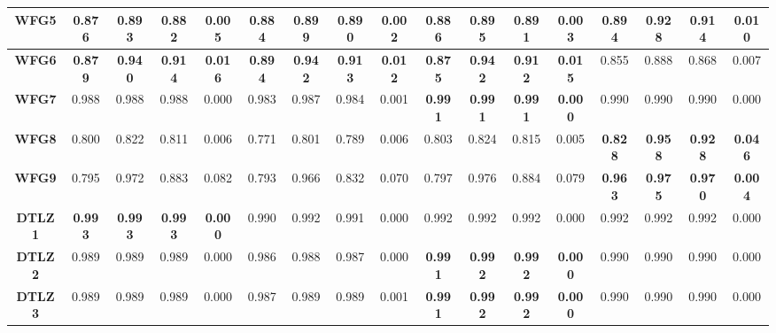 \begin{table*}[t]
{\begin{tabular}{cc|c|c|c|c|c|c|c|c|c|c|c|c|c|c|c}
\multicolumn{1}{c|}{\textbf{WFG5}}  & 0.876          & 0.893          & 0.882          & 0.005          & 0.884          & 0.899          & 0.890          & 0.002          & 0.886          & 0.895          & 0.891          & 0.003          & \textbf{0.894} & \textbf{0.928} & \textbf{0.914} & \textbf{0.010} \\ \hline
\multicolumn{1}{c|}{\textbf{WFG6}}  & \textbf{0.879} & \textbf{0.940} & \textbf{0.914} & \textbf{0.016} & \textbf{0.894} & \textbf{0.942} & \textbf{0.913} & \textbf{0.012} & \textbf{0.875} & \textbf{0.942} & \textbf{0.912} & \textbf{0.015} & 0.855          & 0.888          & 0.868          & 0.007          \\ \hline
\multicolumn{1}{c|}{\textbf{WFG7}}  & 0.988          & 0.988          & 0.988          & 0.000          & 0.983          & 0.987          & 0.984          & 0.001          & \textbf{0.991} & \textbf{0.991} & \textbf{0.991} & \textbf{0.000} & 0.990          & 0.990          & 0.990          & 0.000          \\ \hline
\multicolumn{1}{c|}{\textbf{WFG8}}  & 0.800          & 0.822          & 0.811          & 0.006          & 0.771          & 0.801          & 0.789          & 0.006          & 0.803          & 0.824          & 0.815          & 0.005          & \textbf{0.828} & \textbf{0.958} & \textbf{0.928} & \textbf{0.046} \\ \hline
\multicolumn{1}{c|}{\textbf{WFG9}}  & 0.795          & 0.972          & 0.883          & 0.082          & 0.793          & 0.966          & 0.832          & 0.070          & 0.797          & 0.976          & 0.884          & 0.079          & \textbf{0.963} & \textbf{0.975} & \textbf{0.970} & \textbf{0.004} \\ \hline
\multicolumn{1}{c|}{\textbf{DTLZ1}} & \textbf{0.993} & \textbf{0.993} & \textbf{0.993} & \textbf{0.000} & 0.990          & 0.992          & 0.991          & 0.000          & 0.992          & 0.992          & 0.992          & 0.000          & 0.992          & 0.992          & 0.992          & 0.000          \\ \hline
\multicolumn{1}{c|}{\textbf{DTLZ2}} & 0.989          & 0.989          & 0.989          & 0.000          & 0.986          & 0.988          & 0.987          & 0.000          & \textbf{0.991} & \textbf{0.992} & \textbf{0.992} & \textbf{0.000} & 0.990          & 0.990          & 0.990          & 0.000          \\ \hline
\multicolumn{1}{c|}{\textbf{DTLZ3}} & 0.989          & 0.989          & 0.989          & 0.000          & 0.987          & 0.989          & 0.989          & 0.001          & \textbf{0.991} & \textbf{0.992} & \textbf{0.992} & \textbf{0.000} & 0.990          & 0.990          & 0.990          & 0.000          \\ \hline

\end{tabular}}
\end{table*}
